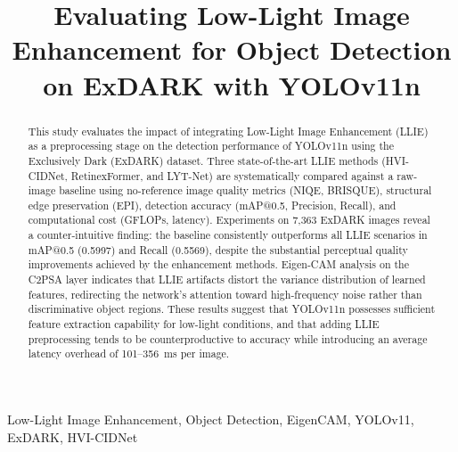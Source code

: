 \documentclass[conference]{IEEEtran}
\begin{document}
\title{Evaluating Low-Light Image Enhancement for Object Detection on ExDARK with YOLOv11n}

\author{
\and
{}
}


\maketitle

\begin{abstract}
This study evaluates the impact of integrating Low-Light Image Enhancement (LLIE) as a preprocessing stage on the detection performance of YOLOv11n using the Exclusively Dark (ExDARK) dataset. Three state-of-the-art LLIE methods (HVI-CIDNet, RetinexFormer, and LYT-Net) are systematically compared against a raw-image baseline using no-reference image quality metrics (NIQE, BRISQUE), structural edge preservation (EPI), detection accuracy (mAP@0.5, Precision, Recall), and computational cost (GFLOPs, latency). Experiments on 7{,}363 ExDARK images reveal a counter-intuitive finding: the baseline consistently outperforms all LLIE scenarios in mAP@0.5 (0.5997) and Recall (0.5569), despite the substantial perceptual quality improvements achieved by the enhancement methods. Eigen-CAM analysis on the C2PSA layer indicates that LLIE artifacts distort the variance distribution of learned features, redirecting the network's attention toward high-frequency noise rather than discriminative object regions. These results suggest that YOLOv11n possesses sufficient feature extraction capability for low-light conditions, and that adding LLIE preprocessing tends to be counterproductive to accuracy while introducing an average latency overhead of 101--356~ms per image.
\end{abstract}

\begin{IEEEkeywords}
Low-Light Image Enhancement, Object Detection, EigenCAM, YOLOv11, ExDARK, HVI-CIDNet
\end{IEEEkeywords}
\end{document}
